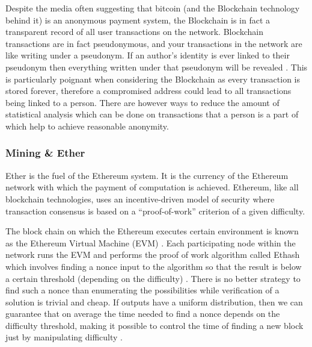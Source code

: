 \documentclass{article}
\begin{document}
Despite the media often suggesting that bitcoin (and the Blockchain technology behind it) is an anonymous payment system, the Blockchain is in fact a transparent record of all user transactions on the network. Blockchain transactions are in fact pseudonymous, and your transactions in the network are like writing under a pseudonym. If an author's identity is ever linked to their pseudonym then everything written under that pseudonym will be revealed \citep{28_anonymity_2016}. This is particularly poignant when considering the Blockchain as every transaction is stored forever, therefore a compromised address could lead to all transactions being linked to a person. There are however ways to reduce the amount of statistical analysis which can be done on transactions that a person is a part of which help to achieve reasonable anonymity.

\subsubsection{Mining \& Ether}
Ether is the fuel of the Ethereum system. It is the currency of the Ethereum network with which the payment of computation is achieved. Ethereum, like all blockchain technologies, uses an incentive-driven model of security where transaction consensus is based on a ``proof-of-work'' criterion of a given difficulty.

The block chain on which the Ethereum executes certain environment is known as the Ethereum Virtual Machine (EVM) \citep{54_ethereum_explained_2017}. Each participating node within the network runs the EVM and performs the proof of work algorithm called Ethash which involves finding a nonce input to the algorithm so that the result is below a certain threshold (depending on the difficulty) \citep{57_introduction_ethereum_frontier_guide_2017}. There is no better strategy to find such a nonce than enumerating the possibilities while verification of a solution is trivial and cheap. If outputs have a uniform distribution, then we can guarantee that on average the time needed to find a nonce depends on the difficulty threshold, making it possible to control the time of finding a new block just by manipulating difficulty \citep{57_introduction_ethereum_frontier_guide_2017}.
\end{document}
